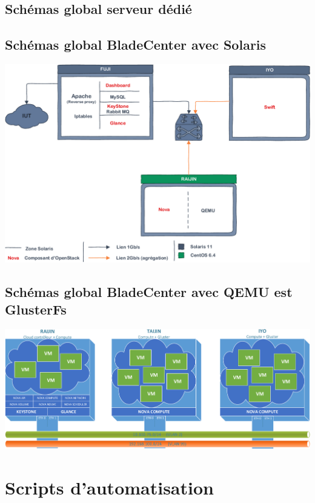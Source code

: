 \documentclass[a4paper,oneside]{report}
\begin{document}
\section{Schémas global serveur dédié}
\section{Schémas global BladeCenter avec Solaris} \label{sch:glob}
\begin{center}
\includegraphics[scale=0.8,angle=90]{images/topoBladeSolaris-crop.pdf}
\end{center}
\section{Schémas global BladeCenter avec QEMU est GlusterFs}

\begin{center}
\includegraphics[scale=0.8,angle=90]{images/SchemaBladeQemuGlut-crop.pdf}
\end{center}

\chapter{Scripts d'automatisation}
\end{document}
